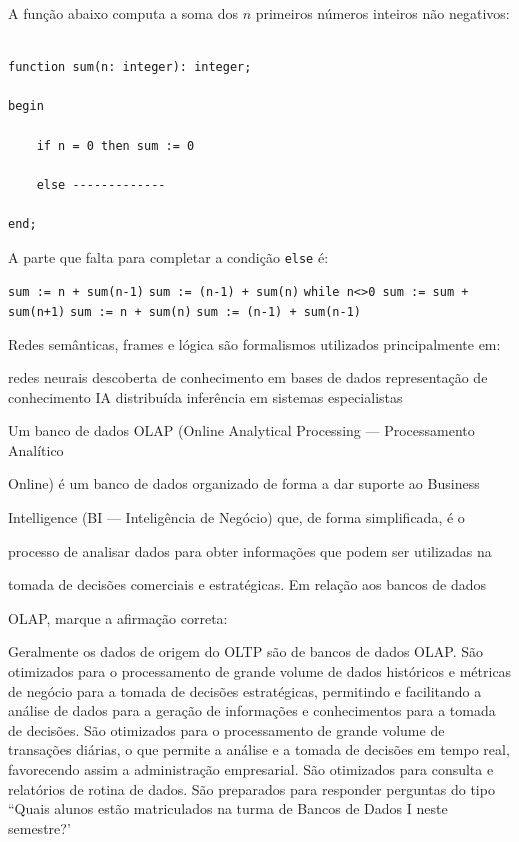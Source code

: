 \documentclass[12pt, addpoints]{exam}
\begin{document}
\begin{questions}
\question

A função abaixo computa a soma dos \( n \) primeiros números inteiros não negativos:



\begin{verbatim}

function sum(n: integer): integer;

begin

    if n = 0 then sum := 0

    else -------------

end;

\end{verbatim}



A parte que falta para completar a condição \texttt{else} é:
\begin{choices}
\choice \texttt{sum := n + sum(n-1)}
\choice \texttt{sum := (n-1) + sum(n)}
\choice \texttt{while n<>0 sum := sum + sum(n+1)}
\choice \texttt{sum := n + sum(n)}
\choice \texttt{sum := (n-1) + sum(n-1)}
\end{choices}

\question

Redes semânticas, frames e lógica são formalismos utilizados principalmente em: 
\begin{choices}
\choice redes neurais
\choice descoberta de conhecimento em bases de dados
\choice representação de conhecimento
\choice IA distribuída
\choice inferência em sistemas especialistas
\end{choices}

\question

Um banco de dados OLAP (Online Analytical Processing --- Processamento Analítico

Online) é um banco de dados organizado de forma a dar suporte ao Business

Intelligence (BI --- Inteligência de Negócio) que, de forma simplificada, é o

processo de analisar dados para obter informações que podem ser utilizadas na

tomada de decisões comerciais e estratégicas. Em relação aos bancos de dados

OLAP, marque a afirmação correta:
\begin{choices}
\choice Geralmente os dados de origem do OLTP são de bancos de dados OLAP.
\choice São otimizados para o processamento de grande volume de dados históricos e métricas de negócio para a tomada de decisões estratégicas, permitindo e facilitando a análise de dados para a geração de informações e conhecimentos para a tomada de decisões.
\choice São otimizados para o processamento de grande volume de transações diárias, o que permite a análise e a tomada de decisões em tempo real, favorecendo assim a administração empresarial.
\choice São otimizados para consulta e relatórios de rotina de dados.
\choice São preparados para responder perguntas do tipo ``Quais alunos estão matriculados na turma de Bancos de Dados I neste semestre?'
\end{choices}


\end{questions}
\end{document}
